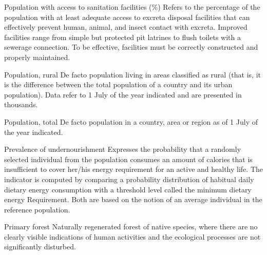 \begin{MetadataCollection} {}
\begin{Energy consumption in agriculture, total} {}
\begin{metadata}{Population with access to sanitation facilities (\%)} {}
Refers to the percentage of the population with at least adequate access to excreta disposal facilities that can effectively prevent human, animal, and insect contact with excreta. Improved facilities range from simple but protected pit latrines to flush toilets with a sewerage connection. To be effective, facilities must be correctly constructed and properly maintained.
\end{metadata}

\begin{metadata}{Population, rural} {}
De facto population living in areas classified as rural (that is, it is the difference between the total population of a country and its urban population). Data refer to 1 July of the year indicated and are presented in thousands.
\end{metadata}

\begin{metadata}{Population, total} {}
De facto population in a country, area or region as of 1 July of the year indicated.
\end{metadata}

\begin{metadata}{Prevalence of undernourishment} {}
Expresses the probability that a randomly selected individual from the population consumes an amount of calories that is insufficient to cover her/his energy requirement for an active and healthy life. The indicator is computed by comparing a probability distribution of habitual daily dietary energy consumption with a threshold level called the minimum dietary energy Requirement. Both are based on the notion of an average individual in the reference population.
\end{metadata}

\begin{metadata}{Primary forest} {}
Naturally regenerated forest of native species, where there are no clearly visible indications of human activities and the ecological processes are not significantly disturbed.
\end{metadata}


\end{Energy consumption in agriculture, total}
\end{MetadataCollection}
